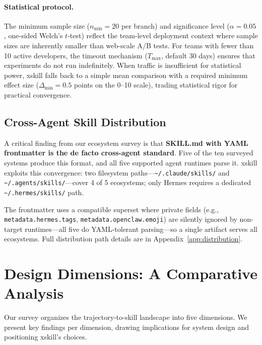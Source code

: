 \documentclass{article}
\begin{document}
\paragraph{Statistical protocol.} The minimum sample size ($n_{\min} = 20$ per branch) and significance level ($\alpha = 0.05$, one-sided Welch's $t$-test) reflect the team-level deployment context where sample sizes are inherently smaller than web-scale A/B tests. For teams with fewer than 10 active developers, the timeout mechanism ($T_{\max}$, default 30 days) ensures that experiments do not run indefinitely. When traffic is insufficient for statistical power, xskill falls back to a simple mean comparison with a required minimum effect size ($\Delta_{\min} = 0.5$ points on the 0--10 scale), trading statistical rigor for practical convergence.

\subsection{Cross-Agent Skill Distribution}
\label{sec:distribution}

A critical finding from our ecosystem survey is that \textbf{SKILL.md with YAML frontmatter is the de facto cross-agent standard}. Five of the ten surveyed systems produce this format, and all five supported agent runtimes parse it. xskill exploits this convergence: two filesystem paths---\texttt{\~{}/.claude/skills/} and \texttt{\~{}/.agents/skills/}---cover 4 of 5 ecosystems; only Hermes requires a dedicated \texttt{\~{}/.hermes/skills/} path.

The frontmatter uses a compatible superset where private fields (e.g., \texttt{metadata.hermes.tags}, \texttt{metadata.openclaw.emoji}) are silently ignored by non-target runtimes---all five do YAML-tolerant parsing---so a single artifact serves all ecosystems. Full distribution path details are in Appendix~\ref{app:distribution}.

\section{Design Dimensions: A Comparative Analysis}
\label{sec:dimensions}

Our survey organizes the trajectory-to-skill landscape into five dimensions. We present key findings per dimension, drawing implications for system design and positioning xskill's choices.
\end{document}
